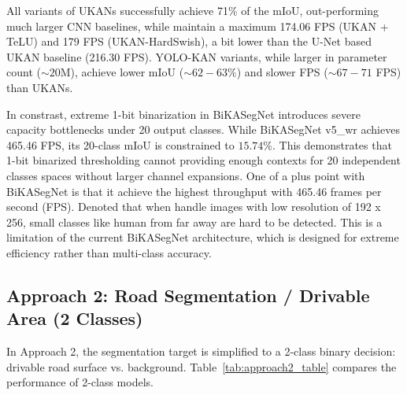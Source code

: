 \documentclass[a4paper]{report}
\begin{document}
All variants of UKANs successfully achieve 71\% of the mIoU, out-performing much larger CNN baselines, while maintain a maximum 174.06 FPS (UKAN + TeLU) and 179 FPS (UKAN-HardSwish), a bit lower than the U-Net based UKAN baseline (216.30 FPS). YOLO-KAN variants, while larger in parameter count ($\sim 20$M), achieve lower mIoU ($\sim 62-63\%$) and slower FPS ($\sim 67-71$ FPS) than UKANs.

In constrast, extreme 1-bit binarization in BiKASegNet introduces severe capacity bottlenecks under 20 output classes. While BiKASegNet v5\_wr achieves 465.46 FPS, its 20-class mIoU is constrained to $15.74\%$. This demonstrates that 1-bit binarized thresholding cannot providing enough contexts  for 20 independent classes spaces without larger channel expansions. One of a plus point with BiKASegNet is that it achieve the highest throughput with 465.46 frames per second (FPS). Denoted that when handle images with low resolution of 192 x 256, small classes like human from far away are hard to be detected. This is a limitation of the current BiKASegNet architecture, which is designed for extreme efficiency rather than multi-class accuracy. 

\subsection{Approach 2: Road Segmentation / Drivable Area (2 Classes)}
\label{sec:approach2_results}

In Approach 2, the segmentation target is simplified to a 2-class binary decision: drivable road surface vs. background. Table~\ref{tab:approach2_table} compares the performance of 2-class models.
\end{document}
